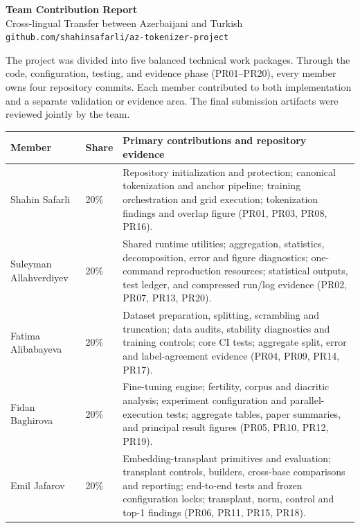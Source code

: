 \documentclass[10pt,a4paper]{article}
\begin{document}
\begin{center}
{\Large\bfseries Team Contribution Report}\\[3pt]
{\large Cross-lingual Transfer between Azerbaijani and Turkish}\\[3pt]
\texttt{github.com/shahinsafarli/az-tokenizer-project}
\end{center}

\small
The project was divided into five balanced technical work packages. Through the
code, configuration, testing, and evidence phase (PR01--PR20), every member owns
four repository commits. Each member contributed to both implementation and a
separate validation or evidence area. The final submission artifacts were
reviewed jointly by the team.

\begin{tabularx}{\textwidth}{@{}Mp{1.35cm}Y@{}}
\toprule
\textbf{Member} & \textbf{Share} & \textbf{Primary contributions and repository evidence} \\
\midrule
Shahin Safarli & 20\% &
Repository initialization and protection; canonical tokenization and anchor
pipeline; training orchestration and grid execution; tokenization findings and
overlap figure (PR01, PR03, PR08, PR16). \\
\addlinespace
Suleyman Allahverdiyev & 20\% &
Shared runtime utilities; aggregation, statistics, decomposition, error and
figure diagnostics; one-command reproduction resources; statistical outputs,
test ledger, and compressed run/log evidence (PR02, PR07, PR13, PR20). \\
\addlinespace
Fatima Alibabayeva & 20\% &
Dataset preparation, splitting, scrambling and truncation; data audits,
stability diagnostics and training controls; core CI tests; aggregate split,
error and label-agreement evidence (PR04, PR09, PR14, PR17). \\
\addlinespace
Fidan Baghirova & 20\% &
Fine-tuning engine; fertility, corpus and diacritic analysis; experiment
configuration and parallel-execution tests; aggregate tables, paper summaries,
and principal result figures (PR05, PR10, PR12, PR19). \\
\addlinespace
Emil Jafarov & 20\% &
Embedding-transplant primitives and evaluation; transplant controls, builders,
cross-base comparisons and reporting; end-to-end tests and frozen configuration
locks; transplant, norm, control and top-1 findings (PR06, PR11, PR15, PR18). \\
\bottomrule
\end{tabularx}
\end{document}
